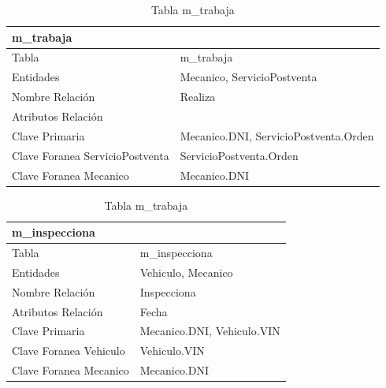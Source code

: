 \documentclass[12pt]{article}
\begin{document}
\begin{table}[h]
    \begin{center}
        \begin{tabular}{|l|l|}
            \multicolumn{2}{l}{\textbf{m\_trabaja}} \\
            \hline
            Tabla & m\_trabaja \\ \hline        
            Entidades & Mecanico, ServicioPostventa \\ \hline
            Nombre Relación & Realiza \\ \hline
            Atributos Relación &  \\ \hline
            Clave Primaria & Mecanico.DNI, ServicioPostventa.Orden \\ \hline
            Clave Foranea ServicioPostventa & ServicioPostventa.Orden \\ \hline
            Clave Foranea Mecanico & Mecanico.DNI \\
            \hline
            \end{tabular}
        \caption{Tabla m\_trabaja}
            \end{center}
\end{table}

\begin{table}[h]
    \begin{center}
        \begin{tabular}{|l|l|}
            \multicolumn{2}{l}{\textbf{m\_inspecciona}} \\
            \hline
            Tabla & m\_inspecciona \\ \hline        
            Entidades & Vehiculo, Mecanico \\ \hline
            Nombre Relación & Inspecciona \\ \hline
            Atributos Relación & Fecha \\ \hline
            Clave Primaria & Mecanico.DNI, Vehiculo.VIN \\ \hline
            Clave Foranea Vehiculo & Vehiculo.VIN \\ \hline
            Clave Foranea Mecanico & Mecanico.DNI \\
            \hline
            \end{tabular}
        \caption{Tabla m\_trabaja}
            \end{center}
\end{table}
\end{document}
